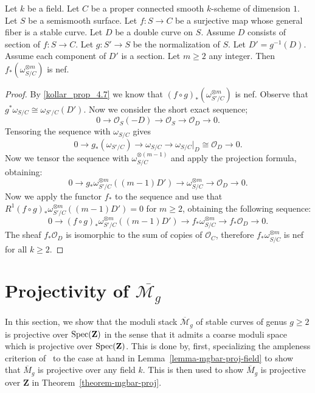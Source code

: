 \begin{lemma}
\label{kollar-theorem-4.9}
Let $k$ be a field.
Let $C$ be a proper connected smooth $k$-scheme of dimension $1$.
Let $S$ be a semismooth surface.
Let $f:S\to C$ be a surjective map whose general fiber is a stable curve.
Let $D$ be a double curve on $S$.
Assume $D$ consists of section of $f:S\to C$.
Let $g:S'\to S$ be the normalization of $S$.
Let $D'=g^{-1}(D)$.
Assume each component of $D'$ is a section.
Let $m\geq 2$ any integer.
Then $f_*(\omega_{S/C}^{\otimes m})$ is nef.
\end{lemma}
\begin{proof}
By \ref{kollar_prop_4.7}
we know that $(f\circ g)_*(\omega_{S'/C}^{\otimes m})$ is nef.
Observe that $g^*\omega_{S/C}\cong \omega_{S'/C}(D')$.
Now we consider the short exact sequence;
$$
0 \to \mathcal{O}_{S}(-D) \to \mathcal{O}_S \to \mathcal{O}_D \to 0.
$$
Tensoring the sequence with $\omega_{S/C}$ gives
$$
0 \to g_*(\omega_{S'/C}) \to \omega_{S/C} \to \omega_{S/C}\rvert_D \cong \mathcal{O}_D \to 0.
$$
Now we tensor the sequence with $\omega_{S/C}^{\otimes (m-1)}$ and apply the
projection formula, obtaining:
$$
0 \to g_*\omega_{S'/C}^{\otimes m}((m-1)D') \to \omega_{S/C}^{\otimes m}\to \mathcal{O}_D\to 0.
$$
Now we apply the functor $f_*$ to the sequence and use that
$R^1(f\circ g)_*\omega_{S'/C}^{\otimes m}((m-1)D')=0$ for $m\geq 2$,
obtaining the following sequence:
$$
  0 \to
  (f\circ g)_*\omega_{S'/C}^{\otimes m}((m-1)D') \to
  f_*\omega_{S/C}^{\otimes m} \to
  f_*\mathcal{O}_D \to
  0.
$$
The sheaf $f_*\mathcal{O}_D$ is isomorphic to the sum of copies of
$\mathcal{O}_C$, therefore $f_*\omega_{S/C}^{\otimes m}$ is nef for
all $k\geq 2$.
\end{proof}

\section{Projectivity of $\overline{\mathcal{M}_g}$}
In this section, we show that the moduli stack $\overline{\mathcal{M}}_g$ of
stable curves of genus $g \geq 2$ is projective over $\mathop{\rm Spec}(\mathbf{Z})$ in the
sense that it admits a coarse moduli space which is projective over
$\mathop{\rm Spec}(\mathbf{Z})$.
This is done by, first, specializing the ampleness criterion
of~\cite[Theorem 2.6]{ko90} to the case at hand in
Lemma~\ref{lemma-mgbar-proj-field} to show that $\overline{M}_g$ is projective
over any field $k$.
This is then used to show $\overline{M}_g$ is projective over $\mathbf{Z}$
in Theorem~\ref{theorem-mgbar-proj}.

